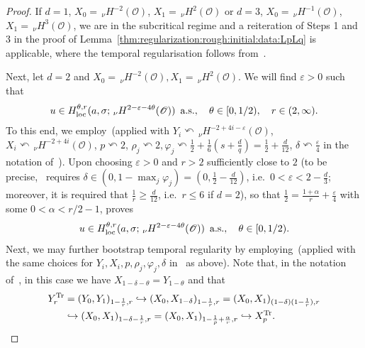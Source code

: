 \documentclass[reqno]{amsart}
\newcommand{\sO}{\mathscr{O}}
\newcommand{\1}{\mathbf{1}}
\newcommand{\loc}{\textup{loc}}
\newcommand{\nH}{\ensuremath{\,_\nu H}}
\newcommand{\bpsn}[1]{\ensuremath{\nH^{#1}(\sO)}}
\begin{document}
	\begin{proof}
		If $d=1$, $X_0=\bpsn{-2}$, $ X_1=\bpsn{2}$ or $d=3$, $ X_0=\bpsn{-1}$, $ X_1=\bpsn{3}$, we are in the subcritical regime and a reiteration of Steps 1 and 3 in the proof of Lemma~\ref{thm:regularization:rough:initial:data:LpLq} is applicable, where the temporal regularisation follows from~\cite[Proposition 5.9]{agrestiNonlinearSPDEsMaximal2025}. 
		
		Next, let $d=2 $ and  $X_0=\bpsn{-2}, X_1=\bpsn{2}$. We will find $\varepsilon>0$ such that 
		\begin{equation}\label{eq:regularization:rough:initial:data:L2L2:proof:1}
			u\in H_{\loc}^{\theta,r}(a,\sigma; \bpsn{2-\varepsilon-4\theta}) \,\text{ a.s.}, \quad \theta\in [0,1/2), \quad r\in (2,\infty).
		\end{equation}
		To this end, we employ~\cite[Proposition 6.8]{agrestiNonlinearParabolicStochastic2022a}(applied with $Y_i \curvearrowleft \bpsn{-2+4i-\varepsilon}$, $X_i \curvearrowleft \bpsn{-2+4i}$, $p\curvearrowleft2$, $\rho_j\curvearrowleft 2, \varphi_j\curvearrowleft \frac12+\frac16(s+\frac{d}{q})=\frac{1}{2}+\frac{d}{12}$, $\delta\curvearrowleft\frac{\varepsilon}{4}$ in the notation of~\cite[Proposition 6.8]{agrestiNonlinearParabolicStochastic2022a}). 
		Upon choosing $\varepsilon>0$ and $r>2$ sufficiently close to $2$ (to be precise,~\cite[Proposition 6.8]{agrestiNonlinearParabolicStochastic2022a} requires $\delta\in (0,1-\max_j \varphi_j)=(0,\frac12-\frac{d}{12})$, i.e.\ $0<\varepsilon< 2-\frac{d}{3}$; moreover, it is required that $\frac1r\ge \frac{d}{12}$, i.e.\ $r\le 6$ if $d=2$), 
        so that $\frac{1}{2}=\frac{1+\alpha}{r}+\frac{\varepsilon}{4}$ with  some $0<\alpha<r/2-1$, 
		\cite[Proposition 6.8]{agrestiNonlinearParabolicStochastic2022a} proves 
        \begin{equation}
            u\in H_{\loc}^{\theta,r}(a,\sigma; \bpsn{2-\varepsilon-4\theta})\,\text{ a.s.}, \quad \theta\in [0,1/2). 
        \end{equation}
        Next, we may further bootstrap temporal regularity by employing~\cite[Corollary 6.5]{agrestiNonlinearParabolicStochastic2022a}(applied with the same choices for $Y_i, X_i, p, \rho_j, \varphi_j, \delta$ in~\cite[Corollary 6.5]{agrestiNonlinearParabolicStochastic2022a} as above). Note that, in the notation of~\cite[Corollary 6.5]{agrestiNonlinearParabolicStochastic2022a}, in this case we have  $X_{1-\delta-\theta}=Y_{1-\theta}$ and that $$\begin{aligned}
            Y_r^{\textup{Tr}} &=(Y_0,Y_1)_{1-\frac1r,r}\hookrightarrow (X_0,X_{1-\delta})_{1-\frac1r,r}=(X_0,X_1)_{(1-\delta)(1-\frac{1}{r}),r}\\&\hookrightarrow (X_0,X_1)_{1-\delta-\frac1r,r}=(X_0,X_1)_{1-\frac1p+\frac{\alpha}{r},r}\hookrightarrow X_p^{\textup{Tr}}.

\end{aligned}$$
\end{proof}
\end{document}
